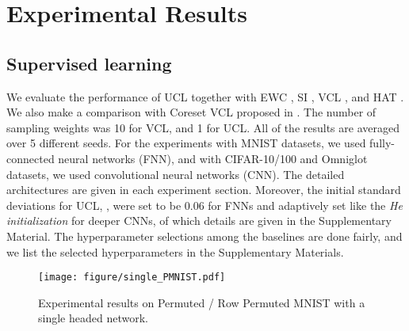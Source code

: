 \section{Experimental Results}




\subsection{Supervised learning}
We evaluate the performance of UCL together with EWC \cite{(EWC)KirkPascRabi17}, SI \cite{(SI)ZenkePooleGang17}, VCL \cite{(VCL)NguLiBuiTurner18}, and HAT \cite{SerraSurisMironKarat2018(HAT)}. We also make a comparison with Coreset VCL proposed in \cite{(VCL)NguLiBuiTurner18}. The number of sampling weights was 10 for VCL, and  1 for UCL.
All of the results are averaged over 5 different seeds. For the experiments with MNIST datasets, we used fully-connected neural networks (FNN), and with CIFAR-10/100 and Omniglot datasets, we used convolutional neural networks (CNN). The detailed architectures are given in each experiment section. Moreover, the initial standard deviations for UCL, , 
were set to be 0.06 for FNNs and adaptively set like the \emph{He initialization} \cite{HeZhaRenSun15} for deeper CNNs, of which details are given in the Supplementary Material. The hyperparameter selections among the baselines are done fairly, and we list the selected hyperparameters in the Supplementary Materials. 










\begin{figure}[ht]
    \centering
    \texttt{[image: figure/single\_PMNIST.pdf]}
    \caption{Experimental results on Permuted / Row Permuted MNIST with a single headed network.}
\label{fig:single_results}
\end{figure}

